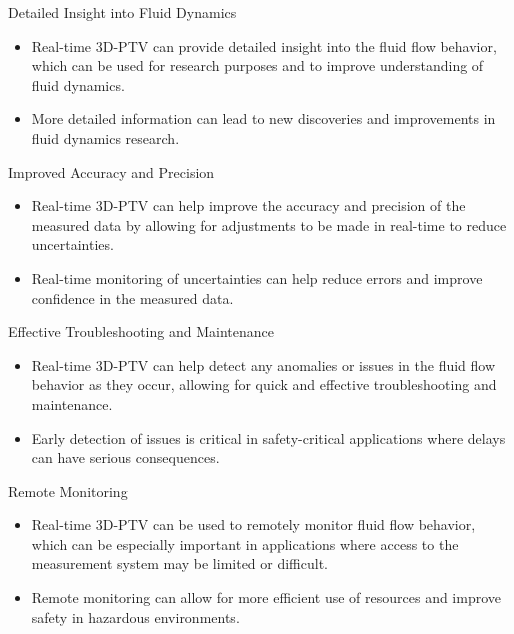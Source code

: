 \begin{frame}{Detailed Insight into Fluid Dynamics}

\begin{itemize}
\item Real-time 3D-PTV can provide detailed insight into the fluid flow behavior, which can be used for research purposes and to improve understanding of fluid dynamics.
\item More detailed information can lead to new discoveries and improvements in fluid dynamics research.
\end{itemize}

\end{frame}

\begin{frame}{Improved Accuracy and Precision}

\begin{itemize}
\item Real-time 3D-PTV can help improve the accuracy and precision of the measured data by allowing for adjustments to be made in real-time to reduce uncertainties.
\item Real-time monitoring of uncertainties can help reduce errors and improve confidence in the measured data.
\end{itemize}

\end{frame}

\begin{frame}{Effective Troubleshooting and Maintenance}

\begin{itemize}
\item Real-time 3D-PTV can help detect any anomalies or issues in the fluid flow behavior as they occur, allowing for quick and effective troubleshooting and maintenance.
\item Early detection of issues is critical in safety-critical applications where delays can have serious consequences.
\end{itemize}

\end{frame}

\begin{frame}{Remote Monitoring}

\begin{itemize}
\item Real-time 3D-PTV can be used to remotely monitor fluid flow behavior, which can be especially important in applications where access to the measurement system may be limited or difficult.
\item Remote monitoring can allow for more efficient use of resources and improve safety in hazardous environments.
\end{itemize}

\end{frame}